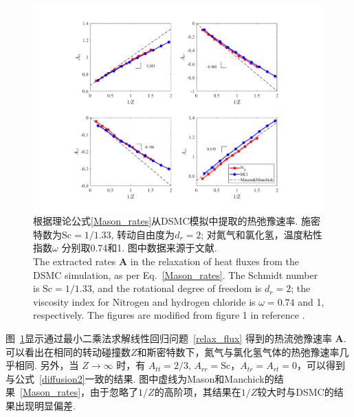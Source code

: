 \begin{figure}[t]
	\centering
	\renewcommand{\figurename}{图}
	\includegraphics[scale=0.4,clip=true]{Fig/Matrix_A.pdf}
	\caption{
		根据理论公式\eqref{Mason_rates}从DSMC模拟中提取的热弛豫速率. 施密特数为$\text{Sc}=1/1.33$, 转动自由度为$d_r=2$; 对氮气和氯化氢，温度粘性指数$\omega$ 分别取0.74和1. 图中数据来源于文献\cite{Li2021Uncertainty}.\\
		The extracted rates $\bm{A}$ in the relaxation of heat fluxes from the DSMC simulation, as per Eq.~\eqref{Mason_rates}. The Schmidt number is $\text{Sc}=1/1.33$, and the rotational degree of freedom is $d_r=2$; the viscosity index for Nitrogen and hydrogen chloride is $\omega=0.74$ and 1, respectively. The figures are modified from figure 1 in reference \cite{Li2021Uncertainty}.
	}
	\label{fig:AZdsmc}
\end{figure}

图~\ref{fig:AZdsmc}显示通过最小二乘法求解线性回归问题~\eqref{relax_flux} 得到的热流弛豫速率 ${\mathbf{A}}$. 可以看出在相同的转动碰撞数$Z$和斯密特数下，氮气与氯化氢气体的热弛豫速率几乎相同. 另外，当 $Z\rightarrow\infty$ 时，有 $A_{tt}=2/3$, $A_{rr}=\text{Sc}$，$A_{tr}=A_{rt}=0$，可以得到与公式~\eqref{diffusion2}一致的结果. 图中虚线为Mason和Manchick的结果~\eqref{Mason_rates}，由于忽略了$1/Z$的高阶项，其结果在$1/Z$较大时与DSMC的结果出现明显偏差.  %


